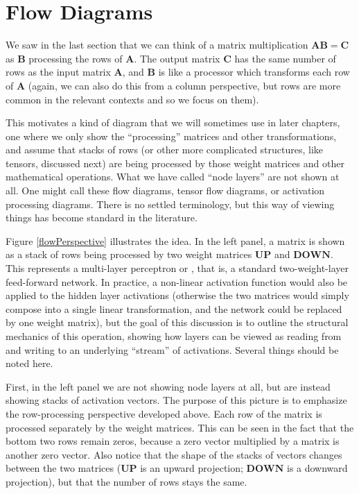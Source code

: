 \section{Flow Diagrams }\label{flowDiagrams}

We saw in the last section that we can think of a matrix multiplication $\mathbf{A}\mathbf{B} = \mathbf{C}$ as  $\mathbf{B}$ processing the rows of $\mathbf{A}$. The output matrix $\mathbf{C}$ has the same number of rows as the input matrix  $\mathbf{A}$, and $\mathbf{B}$  is like a processor which transforms each row of  $\mathbf{A}$ (again, we can also do this from a column perspective, but rows are more common in the relevant contexts and so we focus on them). 

This motivates a kind of diagram that we will sometimes use in later chapters, one where we only show the ``processing'' matrices and other transformations, and assume that stacks of rows (or other more complicated structures, like tensors, discussed next) are being processed by those weight matrices and other mathematical operations. What we have called ``node layers'' are not shown at all. One might call these flow diagrams, tensor flow diagrams, or activation processing diagrams. There is no settled terminology, but this way of viewing things has become standard in the literature.

Figure \ref{flowPerspective} illustrates the idea. In the left panel, a matrix is shown as a stack of rows being processed by two weight matrices $\mathbf{UP}$ and $\mathbf{DOWN}$. This represents a multi-layer perceptron or , that is, a standard two-weight-layer feed-forward network. In practice, a non-linear activation function would also be applied to the hidden layer activations (otherwise the two matrices would simply compose into a single linear transformation, and the network could be replaced by one weight matrix), but the goal of this discussion is to outline the structural mechanics of this operation, showing how layers can be viewed as reading from and writing to an underlying ``stream'' of activations. Several things should be noted here.

First, in the left panel we are not showing node layers at all, but are instead showing stacks of activation vectors. The purpose of this picture is to emphasize the row-processing perspective developed above. Each row of the matrix is processed separately by the weight matrices. This can be seen in the fact that the bottom two rows remain zeros, because a zero vector multiplied by a matrix is another zero vector. Also notice that the shape of the stacks of vectors changes between the two matrices ($\mathbf{UP}$ is an upward projection; $\mathbf{DOWN}$ is a downward projection), but that the number of rows stays the same.  


